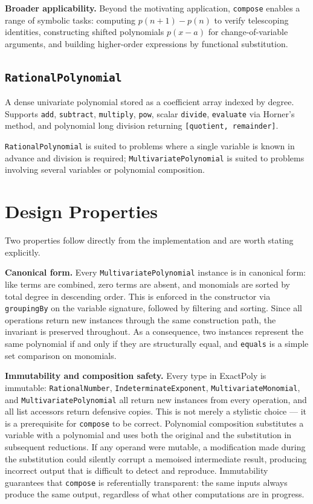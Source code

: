 \documentclass[11pt,a4paper]{article}
\begin{document}
\textbf{Broader applicability.}
Beyond the motivating application, \texttt{compose} enables a range of symbolic
tasks: computing $p(n+1)-p(n)$ to verify telescoping identities,
constructing shifted polynomials $p(x-a)$ for change-of-variable arguments,
and building higher-order expressions by functional substitution.

\subsection{\texttt{RationalPolynomial}}

A dense univariate polynomial stored as a coefficient array indexed by degree.
Supports \texttt{add}, \texttt{subtract}, \texttt{multiply}, \texttt{pow},
scalar \texttt{divide}, \texttt{evaluate} via Horner's method, and polynomial
long division returning \texttt{[quotient, remainder]}.

\texttt{RationalPolynomial} is suited to problems where a single variable is
known in advance and division is required;
\texttt{MultivariatePolynomial} is suited to problems involving several
variables or polynomial composition.

\section{Design Properties}

Two properties follow directly from the implementation and are worth stating
explicitly.

\textbf{Canonical form.}
Every \texttt{MultivariatePolynomial} instance is in canonical form: like terms
are combined, zero terms are absent, and monomials are sorted by total degree
in descending order.
This is enforced in the constructor via \texttt{groupingBy} on the variable
signature, followed by filtering and sorting.
Since all operations return new instances through the same construction path,
the invariant is preserved throughout.
As a consequence, two instances represent the same polynomial if and only if
they are structurally equal, and \texttt{equals} is a simple set comparison on
monomials.

\textbf{Immutability and composition safety.}
Every type in ExactPoly is immutable: \texttt{RationalNumber},
\texttt{IndeterminateExponent}, \texttt{MultivariateMonomial}, and
\texttt{MultivariatePolynomial} all return new instances from every operation,
and all list accessors return defensive copies.
This is not merely a stylistic choice --- it is a prerequisite for
\texttt{compose} to be correct.
Polynomial composition substitutes a variable with a polynomial and uses
both the original and the substitution in subsequent reductions.
If any operand were mutable, a modification made during the substitution
could silently corrupt a memoised intermediate result, producing incorrect
output that is difficult to detect and reproduce.
Immutability guarantees that \texttt{compose} is referentially transparent:
the same inputs always produce the same output, regardless of what other
computations are in progress.
\end{document}
